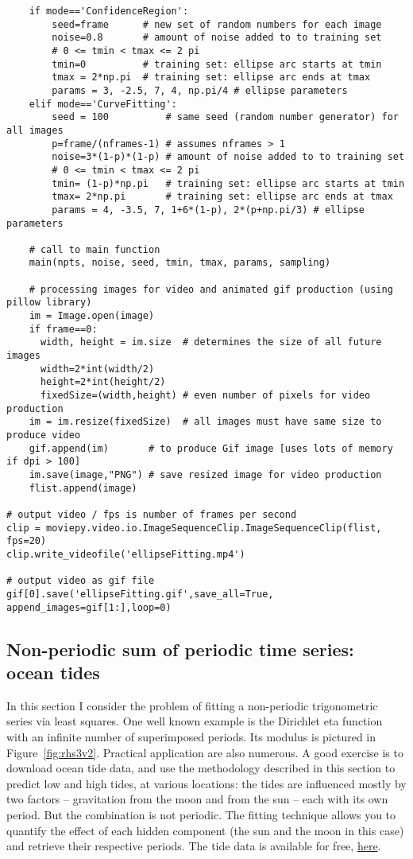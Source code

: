 \documentclass[oneside,10pt]{book}
\begin{document}
\begin{lstlisting}
    if mode=='ConfidenceRegion':
        seed=frame      # new set of random numbers for each image 
        noise=0.8       # amount of noise added to to training set
        # 0 <= tmin < tmax <= 2 pi
        tmin=0          # training set: ellipse arc starts at tmin
        tmax = 2*np.pi  # training set: ellipse arc ends at tmax
        params = 3, -2.5, 7, 4, np.pi/4 # ellipse parameters
    elif mode=='CurveFitting':
        seed = 100          # same seed (random number generator) for all images
        p=frame/(nframes-1) # assumes nframes > 1
        noise=3*(1-p)*(1-p) # amount of noise added to to training set
        # 0 <= tmin < tmax <= 2 pi
        tmin= (1-p)*np.pi   # training set: ellipse arc starts at tmin 
        tmax= 2*np.pi       # training set: ellipse arc ends at tmax  
        params = 4, -3.5, 7, 1+6*(1-p), 2*(p+np.pi/3) # ellipse parameters 

    # call to main function 
    main(npts, noise, seed, tmin, tmax, params, sampling)

    # processing images for video and animated gif production (using pillow library)
    im = Image.open(image)
    if frame==0:  
      width, height = im.size  # determines the size of all future images
      width=2*int(width/2)
      height=2*int(height/2)
      fixedSize=(width,height) # even number of pixels for video production 
    im = im.resize(fixedSize)  # all images must have same size to produce video
    gif.append(im)       # to produce Gif image [uses lots of memory if dpi > 100] 
    im.save(image,"PNG") # save resized image for video production
    flist.append(image)

# output video / fps is number of frames per second
clip = moviepy.video.io.ImageSequenceClip.ImageSequenceClip(flist, fps=20) 
clip.write_videofile('ellipseFitting.mp4')

# output video as gif file 
gif[0].save('ellipseFitting.gif',save_all=True, append_images=gif[1:],loop=0)    
\end{lstlisting}

\subsection{Non-periodic sum of periodic time series: ocean tides}\label{tidesofheav}

In this section I consider the problem of fitting a \textcolor{index}{non-periodic trigonometric series} via least squares. One  well known example 
is the Dirichlet eta function with an infinite number of superimposed periods. Its modulus is pictured in Figure~\ref{fig:rhs3v2}.
Practical application are also numerous. A good exercise
 is to download ocean tide data, and use the methodology described in this section to predict low and high tides, at various locations: the tides are influenced mostly by two factors --
 gravitation from the moon and from the sun -- each with its own period. But the combination is not periodic. The fitting technique allows you
 to quantify the effect of each hidden component (the sun and the moon in this case) and retrieve their respective periods. 
The tide data is available 
 for free, \href{https://tidesandcurrents.noaa.gov/}{here}.
\end{document}
